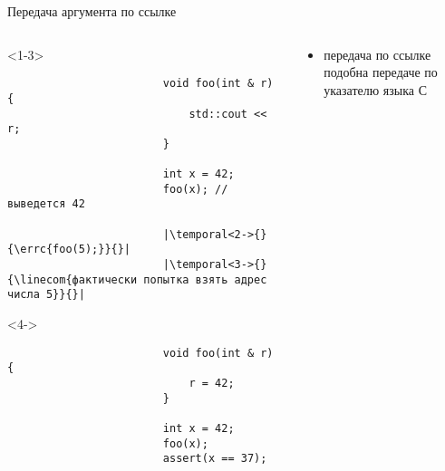 \documentclass[aspectratio=169,14pt]{beamer}
\begin{document}
    \begin{frame}[fragile]{Передача аргумента по ссылке}
        \begin{columns}[T]
            \begin{column}{0.4\textwidth}
                \begin{onlyenv}<1-3>
                    \begin{verbatim}
                        void foo(int & r) {
                            std::cout << r;
                        }

                        int x = 42;
                        foo(x); // выведется 42

                        |\temporal<2->{}{\errc{foo(5);}}{}|
                        |\temporal<3->{}{\linecom{фактически попытка взять адрес числа 5}}{}|
                    \end{verbatim}
                \end{onlyenv}
                \begin{onlyenv}<4->
                    \begin{verbatim}
                        void foo(int & r) {
                            r = 42;
                        }

                        int x = 42;
                        foo(x);
                        assert(x == 37);
                    \end{verbatim}
                \end{onlyenv}
            \end{column}
            \begin{column}{0.6\textwidth}
                \begin{itemize}
                    \item<4-> передача по ссылке подобна передаче по указателю языка С
                \end{itemize}
            \end{column}
        \end{columns}
    \end{frame}
\end{document}
